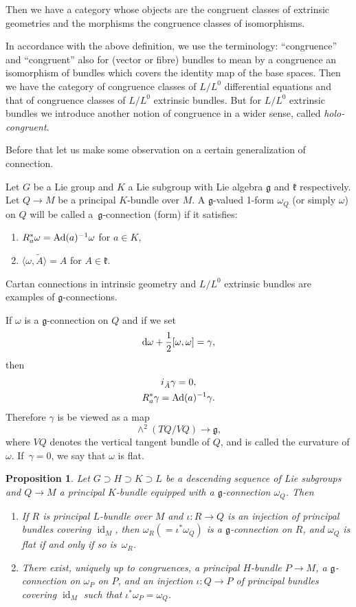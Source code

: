 \documentclass[pdftex]{sigma}%
\newcommand{\g}{\mathfrak g}
\newcommand{\id}{\operatorname{id}}
\newtheorem{prop}[thm]{Proposition}
\numberwithin{equation}{section}
\begin{document}
Then we have a category whose objects are the congruent classes of extrinsic geometries and the morphisms the congruence classes of isomorphisms.

In accordance with the above definition, we use the terminology: ``cong\-ruence'' and ``cong\-ruent'' also for (vector or fibre) bundles to mean by a congruence an isomorphism of bundles which covers the identity map of the base spaces. Then we have the category of congruence classes of $L/L^0$ differential equations and that of congruence classes of $L/L^0$ extrinsic bundles. But for $L/L^0$ extrinsic bundles we introduce another notion of congruence in a wider sense, called \emph{holo-congruent}.


Before that let us make some observation on a certain generalization of connection.

Let $G$ be a Lie group and $K$ a Lie subgroup with Lie algebra $\g$ and $\mathfrak k$ respectively. Let $Q \to M$ be a principal $K$-bundle over $M$. A $\g$-valued 1-form $\omega_Q$ (or simply $\omega$) on $Q$ will be called a~$\g$-con\-nection (form) if it satisfies:
\begin{enumerate}\itemsep=0pt
	\item[$(i)$] $R_a^* \omega = {\rm Ad}(a)^{-1} \omega$ for $a \in K$,
	\item[$(ii)$] $\langle \omega, \tilde A \rangle = A$ for $A \in \mathfrak k$.
\end{enumerate}

Cartan connections in intrinsic geometry and $L/L^0$ extrinsic bundles are examples of $\g$-connections.

If $\omega$ is a $\g$-connection on $Q$ and if we set
\[
{\rm d}\omega + \frac12 [\omega, \omega] = \gamma,
\]
then
\begin{gather*}
	i_{\tilde A}\gamma = 0, \\
	R_a^* \gamma = {\rm Ad}(a)^{-1} \gamma.
\end{gather*}
Therefore $\gamma$ is be viewed as a map
\[
\wedge ^2 ( TQ/VQ) \to \g ,
\]
where $VQ$ denotes the vertical tangent bundle of $Q$, and is called the curvature of $\omega$. If~$\gamma = 0$, we say that $\omega$ is flat.

\begin{prop}
	Let $ G \supset H \supset K \supset L$ be a descending sequence of Lie subgroups and $Q \to M$ a principal $K$-bundle equipped with a $\g$-connection $\omega_Q$. Then
\begin{enumerate}\itemsep=0pt
\item[$(1)$] If $R$ is principal $L$-bundle over $M$ and $\iota\colon R \to Q$ is an injection of principal bundles cove\-ring $\id_M$, then $ \omega_R( = \iota^*\omega_Q)$ is a $\g$-connection on $R$, and $\omega_Q$ is flat if and only if so is~$\omega_R$.
	
\item[$(2)$] There exist, uniquely up to congruences, a principal $H$-bundle $P \to M$, a $\g$-connection on $\omega_P$ on $P$, and an injection $\iota\colon Q \to P$ of principal bundles covering $\id_M$ such that $\iota^* \omega_P = \omega_Q$.
\end{enumerate}
\end{prop}
\end{document}
